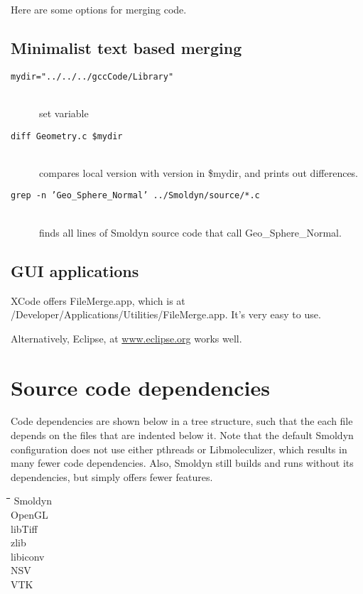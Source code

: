 \documentclass {book}
\begin{document}
Here are some options for merging code.

\subsection*{Minimalist text based merging}

\begin{description}
\item[\texttt{mydir="../../../gccCode/Library"}]
\hfill \\
set variable

\item[\texttt{diff Geometry.c \$mydir}]
\hfill \\
compares local version with version in \$mydir, and prints out differences.

\item[\texttt{grep -n 'Geo\_Sphere\_Normal' ../Smoldyn/source/*.c}]
\hfill \\
finds all lines of Smoldyn source code that call Geo\_Sphere\_Normal.
\end{description}

\subsection*{GUI applications}

XCode offers FileMerge.app, which is at /Developer/Applications/Utilities/FileMerge.app.  It's very easy to use.

Alternatively, Eclipse, at \url{www.eclipse.org} works well.

\section{Source code dependencies}

Code dependencies are shown below in a tree structure, such that the each file depends on the files that are indented below it.  Note that the default Smoldyn configuration does not use either pthreads or Libmoleculizer, which results in many fewer code dependencies.  Also, Smoldyn still builds and runs without its dependencies, but simply offers fewer features.

\begin{tabbing}
\hspace{0.25in}\=\hspace{0.25in}\=\hspace{0.25in}\=\hspace{0.25in}\=\hspace{0.25in}\=\kill
\>Smoldyn\\
\>\>OpenGL\\
\>\>libTiff\\
\>\>zlib\\
\>\>libiconv\\
\>\>NSV\\
\>\>\>VTK\\
\end{tabbing}
\end{document}
